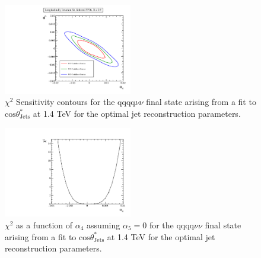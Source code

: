 \begin{figure}
\includegraphics[width=0.5\textwidth]{PhysicsAnalysis/Plots/Chi2ContoursOptimisation/1400GeV/KtSPFOsR0p90.pdf}
\caption[$\chi^{2}$ Sensitivity contours for the $\text{qqqq}\nu\nu$ final state arising from a fit to $\text{cos}\theta^{*}_{\text{Jets}}$ at 1.4 TeV for the optimal jet reconstruction parameters.]{$\chi^{2}$ Sensitivity contours for the $\text{qqqq}\nu\nu$ final state arising from a fit to $\text{cos}\theta^{*}_{\text{Jets}}$ at 1.4 TeV for the optimal jet reconstruction parameters.}
\label{fig:chi2jetalgoideal1400GeV}
\end{figure}

\begin{figure}
\includegraphics[width=0.5\textwidth]{PhysicsAnalysis/Plots/Chi2ContoursOptimisation/1400GeV/KtSPFOsR0p90_alpha4.pdf}
\caption[$\chi^{2}$ as a function of $\alpha_{4}$ assuming $\alpha_{5} = 0$ for the $\text{qqqq}\nu\nu$ final state arising from a fit to $\text{cos}\theta^{*}_{\text{Jets}}$ at 1.4 TeV for the optimal jet reconstruction parameters.]{$\chi^{2}$ as a function of $\alpha_{4}$ assuming $\alpha_{5} = 0$ for the $\text{qqqq}\nu\nu$ final state arising from a fit to $\text{cos}\theta^{*}_{\text{Jets}}$ at 1.4 TeV for the optimal jet reconstruction parameters.}
\label{fig:a4chi2jetalgoideal1400GeV}
\end{figure}

